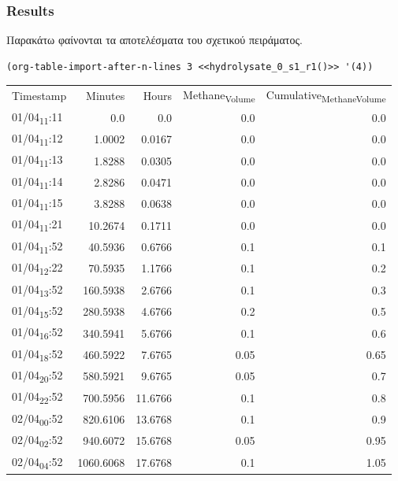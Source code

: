 \documentclass[11pt]{article}
\begin{document}
\subsubsection{Results}
\label{sec:orgb4cd610}
Παρακάτω φαίνονται τα αποτελέσματα του σχετικού πειράματος.

\begin{verbatim}
(org-table-import-after-n-lines 3 <<hydrolysate_0_s1_r1()>> '(4))
\end{verbatim}

\begin{center}
\begin{tabular}{lrrrr}
Timestamp & Minutes & Hours & Methane\textsubscript{Volume} & Cumulative\textsubscript{Methane}\textsubscript{Volume}\\[0pt]
01/04\textsubscript{11}:11 & 0.0 & 0.0 & 0.0 & 0.0\\[0pt]
01/04\textsubscript{11}:12 & 1.0002 & 0.0167 & 0.0 & 0.0\\[0pt]
01/04\textsubscript{11}:13 & 1.8288 & 0.0305 & 0.0 & 0.0\\[0pt]
01/04\textsubscript{11}:14 & 2.8286 & 0.0471 & 0.0 & 0.0\\[0pt]
01/04\textsubscript{11}:15 & 3.8288 & 0.0638 & 0.0 & 0.0\\[0pt]
01/04\textsubscript{11}:21 & 10.2674 & 0.1711 & 0.0 & 0.0\\[0pt]
01/04\textsubscript{11}:52 & 40.5936 & 0.6766 & 0.1 & 0.1\\[0pt]
01/04\textsubscript{12}:22 & 70.5935 & 1.1766 & 0.1 & 0.2\\[0pt]
01/04\textsubscript{13}:52 & 160.5938 & 2.6766 & 0.1 & 0.3\\[0pt]
01/04\textsubscript{15}:52 & 280.5938 & 4.6766 & 0.2 & 0.5\\[0pt]
01/04\textsubscript{16}:52 & 340.5941 & 5.6766 & 0.1 & 0.6\\[0pt]
01/04\textsubscript{18}:52 & 460.5922 & 7.6765 & 0.05 & 0.65\\[0pt]
01/04\textsubscript{20}:52 & 580.5921 & 9.6765 & 0.05 & 0.7\\[0pt]
01/04\textsubscript{22}:52 & 700.5956 & 11.6766 & 0.1 & 0.8\\[0pt]
02/04\textsubscript{00}:52 & 820.6106 & 13.6768 & 0.1 & 0.9\\[0pt]
02/04\textsubscript{02}:52 & 940.6072 & 15.6768 & 0.05 & 0.95\\[0pt]
02/04\textsubscript{04}:52 & 1060.6068 & 17.6768 & 0.1 & 1.05\\[0pt]

\end{tabular}
\end{center}
\end{document}
